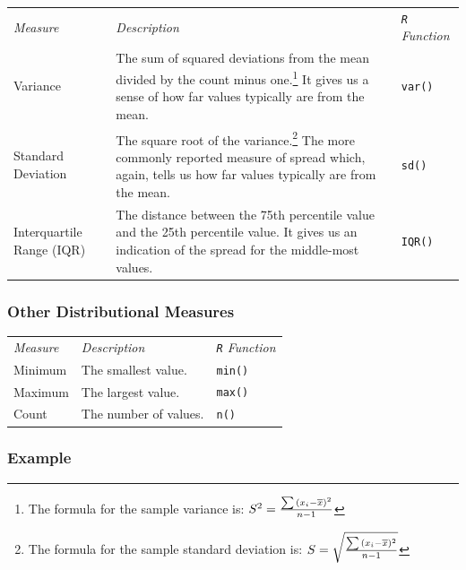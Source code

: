 \documentclass[
  letterpaper,
]{book}
\begin{document}
\begin{longtable}[]{@{}
  >{\raggedright\arraybackslash}p{}
  >{\raggedright\arraybackslash}p{}
  >{\raggedright\arraybackslash}p{}@{}}
\toprule\noalign{}
\endhead
\bottomrule\noalign{}
\endlastfoot
\emph{Measure} & \emph{Description} & \emph{\texttt{R} Function} \\
Variance & The sum of squared deviations from the mean divided by the
count minus one.\footnote{The formula for the sample variance is:
  \(S^2={{\sum{({x_i - \overline{x}})^2 }} \over{n-1}}\)} It gives us a
sense of how far values typically are from the mean. & \texttt{var()} \\
Standard Deviation & The square root of the variance.\footnote{The
  formula for the sample standard deviation is:
  \(S={\sqrt{{\sum{({x_i - \overline{x}})^2 }} \over{n-1}}}\)} The more
commonly reported measure of spread which, again, tells us how far
values typically are from the mean. & \texttt{sd()} \\
Interquartile Range (IQR) & The distance between the 75th percentile
value and the 25th percentile value. It gives us an indication of the
spread for the middle-most values. & \texttt{IQR()} \\
\end{longtable}

\hypertarget{other-distributional-measures}{%
\subsubsection*{Other Distributional
Measures}\label{other-distributional-measures}}

\begin{longtable}[]{@{}lll@{}}
\toprule\noalign{}
\endhead
\bottomrule\noalign{}
\endlastfoot
\emph{Measure} & \emph{Description} & \emph{\texttt{R} Function} \\
Minimum & The smallest value. & \texttt{min()} \\
Maximum & The largest value. & \texttt{max()} \\
Count & The number of values. & \texttt{n()} \\
\end{longtable}

\hypertarget{example}{%
\subsubsection*{Example}\label{example}}
\end{document}
